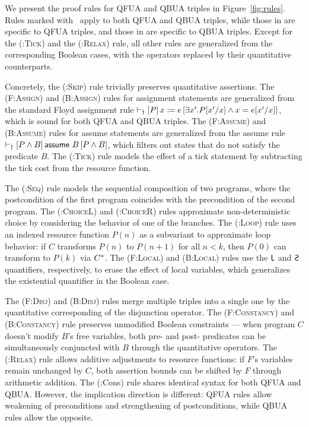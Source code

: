 We present the proof rules for QFUA and QBUA triples in Figure~\ref{fig:rules}. Rules marked with \textdagger\ apply to both QFUA and QBUA triples, while those in  are specific to QFUA triples, and those in  are specific to QBUA triples. Except for the \textsc{(\textdagger:Tick)} and the \textsc{(\textdagger:Relax)} rule, all other rules are generalized from the corresponding Boolean cases, with the operators replaced by their quantitative counterparts.

Concretely, the \textsc{(\textdagger:Skip)} rule trivially preserves quantitative assertions.
The \textsc{(F:Assign)} and \textsc{(B:Assign)} rules for assignment statements are generalized from the standard Floyd assignment rule $\vdash_{\text{\textdagger}}\left[P\right]x\coloneqq e\left[\exists x'.P[x'/x] \land x=e[x'/x]\right]$, which is sound for both QFUA and QBUA triples.
The \textsc{(F:Assume)} and \textsc{(B:Assume)} rules for assume statements are generalized from the assume rule $\vdash_{\text{\textdagger}}\left[P\land B\right]\textsf{assume}~B\left[P\land B\right]$, which filters out states that do not satisfy the predicate $B$.
The \textsc{(\textdagger:Tick)} rule models the effect of a tick statement by subtracting the tick cost from the resource function.

The \textsc{(\textdagger:Seq)} rule models the sequential composition of two programs, where the postcondition of the first program coincides with the precondition of the second program.
The \textsc{(\textdagger:ChoiceL)} and \textsc{(\textdagger:ChoiceR)} rules approximate non-deterministic choice by considering the behavior of one of the branches.
The \textsc{(\textdagger:Loop)} rule uses an indexed resource function $P(n)$ as a subvariant to approximate loop behavior: if $C$ transforms $P(n)$ to $P(n+1)$ for all $n < k$, then $P(0)$ can transform to $P(k)$ via $C^*$.
The \textsc{(F:Local)} and \textsc{(B:Local)} rules use the $\Inf$ and $\Sup$ quantifiers, respectively, to erase the effect of local variables, which generalizes the existential quantifier in the Boolean case.

The \textsc{(F:Disj)} and \textsc{(B:Disj)} rules merge multiple triples into a single one by the quantitative corresponding of the disjunction operator.
The \textsc{(F:Constancy)} and \textsc{(B:Constancy)} rule preserves unmodified Boolean constraints — when program $C$ doesn't modify $B$'s free variables, both pre- and post- predicates can be simultaneously conjuncted with $B$ through the quantitative operators.
The \textsc{(\textdagger:Relax)} rule allows additive adjustments to resource functions: if $F$'s variables remain unchanged by $C$, both assertion bounds can be shifted by $F$ through arithmetic addition.
The (\textdagger:Cons) rule shares identical syntax for both QFUA and QBUA. However, the implication direction is different: QFUA rules allow weakening of preconditions and strengthening of postconditions, while QBUA rules allow the opposite.

